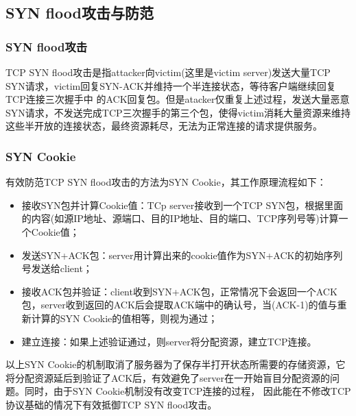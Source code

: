 \subsection{SYN flood攻击与防范}
\subsubsection{SYN flood攻击}
TCP SYN flood攻击是指attacker向victim(这里是victim server)发送大量TCP SYN请求，victim回复SYN-ACK并维持一个半连接状态，等待客户端继续回复TCP连接三次握手中
的ACK回复包。但是atacker仅重复上述过程，发送大量恶意SYN请求，不发送完成TCP三次握手的第三个包，使得victim消耗大量资源来维持这些半开放的连接状态，最终资源耗尽，无法为正常连接的请求提供服务。

\subsubsection{SYN Cookie}
有效防范TCP SYN flood攻击的方法为SYN Cookie，其工作原理流程如下：
\begin{itemize}
    \item 接收SYN包并计算Cookie值：TCp server接收到一个TCP SYN包，根据里面的内容(如源IP地址、源端口、目的IP地址、目的端口、TCP序列号等)计算一个Cookie值；
    \item 发送SYN+ACK包：server用计算出来的cookie值作为SYN+ACK的初始序列号发送给client；
    \item 接收ACK包并验证：client收到SYN+ACK包，正常情况下会返回一个ACK包，server收到返回的ACK后会提取ACK端中的确认号，当(ACK-1)的值与重新计算的SYN Cookie的值相等，则视为通过；
    \item 建立连接：如果上述验证通过，则server将分配资源，建立TCP连接。
\end{itemize}
以上SYN Cookie的机制取消了服务器为了保存半打开状态所需要的存储资源，它将分配资源延后到验证了ACK后，有效避免了server在一开始盲目分配资源的问题。同时，由于SYN Cookie机制没有改变TCP连接的过程，
因此能在不修改TCP协议基础的情况下有效抵御TCP SYN flood攻击。
